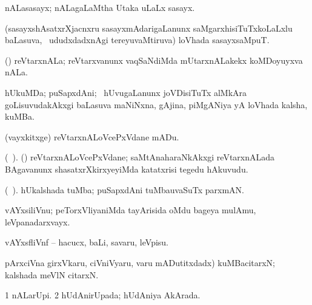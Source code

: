 \bentry
{}
\gl{\nA}
\expl{}
\bmng
 nALasasayx; nALagaLaMtha Utaka uLaLx sasayx. 
\emng
\eentry

\bentry
{} 
\gl{\nA}
\bmng
 (sasayxshAsatxrXjacnxru sasayxmAdarigaLanunx saMgarxhisiTuTxkoLaLxlu baLasuva, \sA\ ududxdadxnAgi tereyuvaMtiruva) loVhada sasayxsaMpuT. 
\emng
\eentry

\bentry
{} 
\gl{\nA}
\bmng
 (\aMrashA) reVtarxnALa; reVtarxvanunx vaqSaNdiMda mUtarxnALakekx koMDoyuyxva nALa. 
\emng
\eentry

\bentry
{} 
\gl{\nA}
\expl{}
\bmng
 hUkuMDa; puSapxdAni; \kanmu\ hUvugaLanunx joVDisiTuTx alMkAra goLisuvudakAkxgi baLasuva maNiNxna, gAjina, piMgANiya yA loVhada kalsha, kuMBa. 
\emng
\eentry

\bentry
{} 
\gl{\sakirx}
\expl{}
\bmng
\emng
\eentry

\bentry
{} 
\gl{\sakirx}
\expl{}
\bmng
 (vayxkitxge) reVtarxnALoVcePxVdane mADu. 
\emng
\eentry

\bentry
{} 
\gl{\nA}(\bava\ ). 
\bmng
 (\shaveY) reVtarxnALoVcePxVdane; saMtAnaharaNkAkxgi reVtarxnALada BAgavanunx shasatxrXkirxyeyiMda katatxrisi tegedu hAkuvudu. 
\emng
\eentry

\bentry
{} 
\gl{\nA}(\bava\ ). 
\bmng
 hUkalshada tuMba; puSapxdAni tuMbauvaSuTx parxmAN. 
\emng
\eentry

\bentry
{} 
\gl{\nA}
\expl{(\P) }
\bmng
 vAYxsiliVnu; peTorxVliyaniMda tayArisida oMdu bageya mulAmu, leVpanadarxvayx. 
\emng
\eentry

\bentry
{} 
\gl{\sakirx}
\expl{}
\bmng
 vAYxsfliVnf -- hacucx, baLi, savaru, leVpisu. 
\emng
\eentry

\bentry
{}
\gl{\nA}
\expl{}
\bmng
 \eng{(} pArxciVna girxVkaru, ciVniVyaru, \mo varu mADutitxdadx) kuMBacitarxN; kalshada meVlN citarxN. 
\emng
\eentry

\bentry
{} 
\gl{\gu}
\expl{}
\bmng
\bnum
\num{1} nALarUpi. 
\num{2} hUdAnirUpada; hUdAniya AkArada. 
\enum
\emng
\eentry

